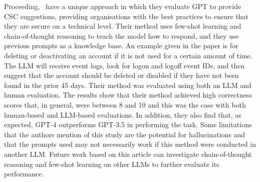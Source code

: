 Proceeding,~\cite{ahmed2024prompting} have a unique approach in which they evaluate GPT to provide CSC suggestions, providing organisations with the best practices to ensure that they are secure on a technical level. Their method uses few-shot learning and chain-of-thought reasoning to teach the model how to respond, and they use previous prompts as a knowledge base. An example given in the paper is for deleting or deactivating an account if it is not used for a certain amount of time. The LLM will receive event logs, look for logon and logoff event IDs, and then suggest that the account should be deleted or disabled if they have not been found in the prior 45 days. Their method was evaluated using both an LLM and human evaluation. The results show that their method achieved high correctness scores that, in general, were between 8 and 10 and this was the case with both human-based and LLM-based evaluations. In addition, they also find that, as expected, GPT-4 outperforms GPT-3.5 in performing the task. Some limitations that the authors mention of this study are the potential for hallucinations and that the prompts used may not necessarily work if this method were conducted in another LLM. Future work based on this article can investigate chain-of-thought reasoning and few-shot learning on other LLMs to further evaluate its performance.

